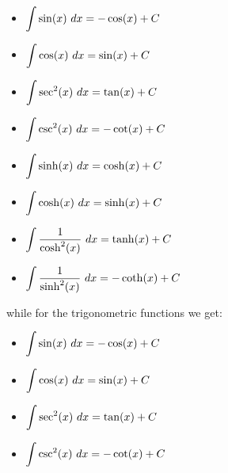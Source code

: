 \begin{multicols}{2}
\begin{itemize}
\item $\displaystyle\int \sin (x)\ dx = -\cos (x)+C$
\item $\displaystyle\int \cos (x)\ dx = \sin (x)+C$
\item $\displaystyle\int \sec^2 (x)\ dx = \tan (x)+C$
\item $\displaystyle\int \csc^2 (x)\ dx = -\cot (x)+C$
\item $\displaystyle\int \sinh (x)\ dx = \cosh (x)+C$
\item $\displaystyle\int \cosh (x)\ dx = \sinh (x)+C$
\item $\displaystyle\int \dfrac{1}{\cosh^2(x)}\ dx= \tanh(x) + C$ 
\item $\displaystyle\int \dfrac{1}{\sinh^2(x)}\ dx =- \coth(x) + C $
\end{itemize}
\end{multicols}
\fi

\ifcalculus
while for the trigonometric functions we get:


\begin{itemize}
\item $\displaystyle\int \sin (x)\ dx = -\cos (x)+C$
\item $\displaystyle\int \cos (x)\ dx = \sin (x)+C$
\item $\displaystyle\int \sec^2 (x)\ dx = \tan (x)+C$
\item $\displaystyle\int \csc^2 (x)\ dx = -\cot (x)+C$
\end{itemize}

\fi



